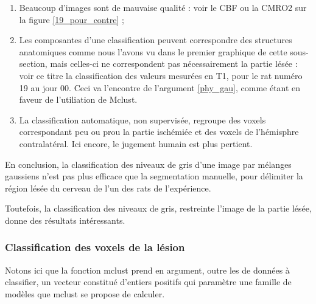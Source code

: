 \begin{enumerate}[label=\textbf{(Contre\arabic*)}]
\item Beaucoup d'images sont de mauvaise qualit\'e : voir le CBF ou la CMRO2 sur la figure \ref{19_pour_contre} ;
%
\item Les composantes d'une classification peuvent correspondre  des structures anatomiques comme nous l'avons vu dans le premier graphique de cette sous-section, %
mais celles-ci ne correspondent pas n\'ecessairement  la partie l\'es\'ee : %
voir  ce titre la classification des valeurs mesur\'ees en T1, pour le rat num\'ero 19 au jour 00. %
Ceci va  l'encontre de l'argument \ref{phy_gau}, comme \'etant en faveur de l'utiliation de Mclust.
%
\item La classification automatique, non supervis\'ee, regroupe des voxels correspondant peu ou prou  la partie isch\'emi\'ee et des voxels de l'h\'emisphre contralat\'eral. %
Ici encore, le jugement humain est plus pertient.
\end{enumerate}

\ligneinter
En conclusion, la classification des niveaux de gris d'une image par m\'elanges gaussiens n'est pas plus efficace que la segmentation manuelle, %
pour d\'elimiter la r\'egion l\'es\'ee du cerveau de l'un des rats de l'exp\'erience.

\par
Toutefois, la classification des niveaux de gris, restreinte  l'image de la partie l\'es\'ee, donne des r\'esultats int\'eressants.

\FloatBarrier
\subsubsection{Classification des voxels de la l\'esion}

Notons ici que la fonction mclust prend en argument, outre les de données à classifier,
un vecteur constitué d'entiers positifs qui paramètre une famille de modèles que mclust se propose de calculer.

